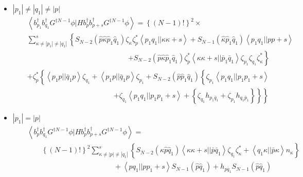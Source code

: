 \begin{itemize}
\item $\left| p_{1}\right| \neq \left| q_{1}\right| \neq \left| p\right| $%
\begin{eqnarray}
&&\left\langle b_{p_{1}}^{\dagger }b_{q_{1}}^{\dagger }G^{\dagger N-1}\phi
|Hb_{p}^{\dagger }b_{p+s}^{\dagger }G^{\dagger N-1}\phi \right\rangle
=\left\{ \left( N-1\right) !\right\} ^{2}\times  \nonumber \\
&&\sum_{\kappa \neq \left| p_{1}\right| \neq \left| q_{1}\right|
}^{s}\left\{ S_{N-2}\left( \hat{p}\hat{\kappa}\hat{p}_{1}\hat{q}_{1}\right)
\zeta _{\kappa }\zeta _{p}^{\ast }\left\langle p_{1}q_{1}||\kappa \kappa
+s\right\rangle +S_{N-1}\left( \hat{\kappa}\hat{p}_{1}\hat{q}_{1}\right)
\left\langle p_{1}q_{1}||pp+s\right\rangle \right.  \nonumber \\
&&\qquad \qquad \qquad \qquad \qquad \qquad \qquad \left. +S_{N-2}\left( 
\hat{p}\hat{\kappa}\hat{p}_{1}\hat{q}_{1}\right) \zeta _{p}^{\ast
}\left\langle \kappa \kappa +s||\bar{p}_{1}\bar{q}_{1}\right\rangle \zeta
_{p_{1}}\zeta _{q_{1}}\zeta _{\kappa }^{\ast }\right\}  \nonumber \\
&&+\zeta _{p}^{\ast }\left\{ \left\langle p_{1}p||\bar{q}_{1}p\right\rangle
\zeta _{q_{1}}+\left\langle p_{1}p||\bar{q}_{1}p\right\rangle \zeta
_{p_{1}}+S_{N-2}\left( \hat{p}\hat{p}_{1}\hat{q}_{1}\right) \left\{ \zeta
_{p_{1}}\left\langle p_{1}q_{1}||p_{1}p_{1}+s\right\rangle \right. \right. 
\nonumber \\
&&\qquad \qquad \qquad \qquad \qquad \qquad \left. \left. +\zeta
_{q_{1}}\left\langle p_{1}q_{1}||p_{1}p_{1}+s\right\rangle +\left\{ \zeta
_{q_{1}}h_{p_{1}\bar{q}_{1}}+\zeta _{p_{1}}h_{q_{1}\bar{p}_{1}}\right\}
\right\} \right\}
\end{eqnarray}

\item $\left| p_{1}\right| =\left| p\right| $%
\begin{eqnarray}
&&\left\langle b_{p}^{\dagger }b_{q_{1}}^{\dagger }G^{\dagger N-1}\phi
|Hb_{p}^{\dagger }b_{p+s}^{\dagger }G^{\dagger N-1}\phi \right\rangle = 
\nonumber \\
&&\qquad \left\{ \left( N-1\right) !\right\} ^{2}\sum_{\kappa \neq \left|
p\right| \neq \left| q_{1}\right| }^{s}\left\{ S_{N-2}\left( \hat{\kappa}%
\hat{p}\hat{q}_{1}\right) \left\langle \kappa \kappa +s||\bar{p}\bar{q}%
_{1}\right\rangle \zeta _{q_{1}}\zeta _{\kappa }^{\ast }+\left\langle
q_{1}\kappa ||\bar{p}\kappa \right\rangle n_{\kappa }\right\}  \nonumber \\
&&\qquad \qquad \qquad \qquad \qquad \qquad +\left\langle
pq_{1}||pp_{1}+s\right\rangle S_{N-1}\left( \hat{p}\hat{q}_{1}\right) +h_{p%
\bar{q}_{1}}S_{N-1}\left( \hat{p}\hat{q}_{1}\right)
\end{eqnarray}


\end{itemize}
